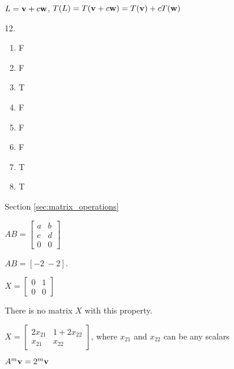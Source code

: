 \begin{multicols}{2}
\item $L= \mathbf{v}+c\mathbf{w}$, $T(L) = T(\mathbf{v}+c\mathbf{w}) = T(\mathbf{v}) + cT(\mathbf{w})$ 

\oee

\be
\item[12.]
\begin{enumerate}[label=(\alph*), leftmargin=1\parindent]
\item  F
\item F
\item T
\item F
\item F
\item F
\item T
\item T
\end{enumerate}

\ee

\hspace{-0.25in} Section \ref{sec:matrix_operations}

\obe

\item 
\ba
\item $AB = \left[ \begin{array}{cc} a&b \\ c&d \\ 0&0 \end{array} \right]$

\item $AB  = [-2 \ -2]$.

\ea

\item 
\ba
\item $X = \left[ \begin{array}{cc} 0&1\\0&0 \end{array} \right]$ 

\item There is no matrix $X$ with this property. 

\item $X = \left[ \begin{array}{cc} 2x_{21}&1+2x_{22}\\x_{21}&x_{22} \end{array} \right]$, where $x_{21}$ and $x_{22}$ can be any scalars 

\ea

\item $A^m \mathbf{v} = 2^m \mathbf{v}$


\end{multicols}
